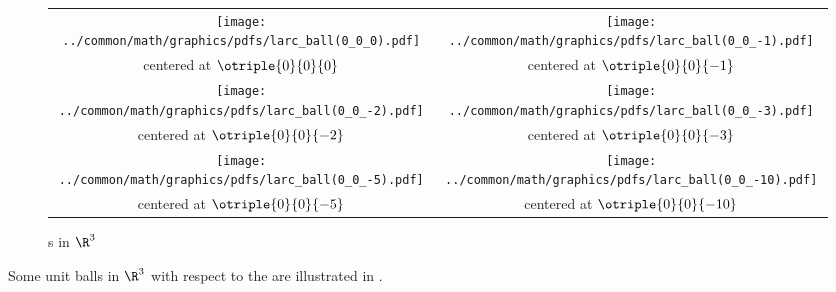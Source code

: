 \begin{figure}
  \centering%
  \begin{tabstr}{0.75}\begin{tabular}{cc}
        \texttt{[image: ../common/math/graphics/pdfs/larc\_ball(0\_0\_0).pdf]} 
      & \texttt{[image: ../common/math/graphics/pdfs/larc\_ball(0\_0\_-1).pdf]} 
      \\centered at $\otriple{0}{0}{0}$
      & centered at $\otriple{0}{0}{-1}$
    \\
        \texttt{[image: ../common/math/graphics/pdfs/larc\_ball(0\_0\_-2).pdf]} 
      & \texttt{[image: ../common/math/graphics/pdfs/larc\_ball(0\_0\_-3).pdf]} 
      \\centered at $\otriple{0}{0}{-2}$
      & centered at $\otriple{0}{0}{-3}$
    \\
        \texttt{[image: ../common/math/graphics/pdfs/larc\_ball(0\_0\_-5).pdf]} 
      & \texttt{[image: ../common/math/graphics/pdfs/larc\_ball(0\_0\_-10).pdf]} 
      \\centered at $\otriple{0}{0}{-5}$
      & centered at $\otriple{0}{0}{-10}$
  \end{tabular}\end{tabstr}
  \caption{s in $\R^3$ \label{fig:larcR3}}
\end{figure}
\begin{example}
\label{ex:larcR3balls}
Some unit balls in $\R^3$ with respect to the  are illustrated in .
\end{example}


